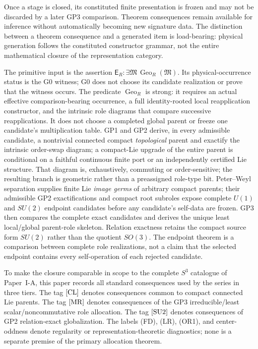 \documentclass[12pt,a4paper]{article}
\begin{document}
Once a stage is closed, its constituted finite presentation is frozen and may
not be discarded by a later GP3 comparison.  Theorem consequences remain
available for inference without automatically becoming new signature data.
The distinction between a theorem consequence and a generated item is
load-bearing: physical generation follows the constituted constructor grammar,
not the entire mathematical closure of the representation category.

The primitive input is the assertion
\(\mathsf E_R:\exists\mathfrak M\,\operatorname{Geo}_R(\mathfrak M)\).
Its physical-occurrence status is the G0 witness; G0 does not choose its
candidate realization or prove that the witness occurs.
The predicate \(\operatorname{Geo}_R\) is strong: it requires an actual
effective comparison-bearing occurrence, a full identity-rooted local
reapplication constructor, and the intrinsic role diagrams that compare
successive reapplications.  It does not choose a completed global parent or
freeze one candidate's multiplication table.  GP1 and GP2 derive, in every
admissible candidate, a nontrivial connected compact \emph{topological}
parent and exactify the intrinsic order-swap diagram; a compact-Lie upgrade
of the entire parent is conditional on a faithful continuous finite port or
an independently certified Lie structure.  That diagram is, exhaustively, commuting or
order-sensitive; the resulting branch is geometric rather than a preassigned
role-type bit.  Peter--Weyl separation supplies finite Lie \emph{image germs} of arbitrary
compact parents; their admissible GP2 exactifications and compact root
subroles expose complete \(U(1)\) and \(SU(2)\) endpoint candidates
before any candidate's self-data are frozen.  GP3 then compares the complete exact candidates and
derives the unique least local/global parent-role skeleton.  Relation exactness
retains the compact source form \(SU(2)\) rather than the quotient \(SO(3)\).
The endpoint theorem is a comparison between complete role realizations, not a
claim that the selected endpoint contains every self-operation of each rejected
candidate.

To make the closure comparable in scope to the complete \(S^3\) catalogue of
Paper~I-A, this paper records all standard consequences used by the series in
three tiers.  The tag \([{\rm CL}]\) denotes consequences common to compact
connected Lie parents.  The tag \([{\rm MR}]\) denotes consequences of the
GP3 irreducible/least scalar/noncommutative role allocation.  The tag
\([{\rm SU2}]\) denotes consequences of GP2 relation-exact globalization.
The labels (FD), (LR), (OR1), and center-oddness denote
regularity or representation-theoretic diagnostics; none is a separate
premise of the primary allocation theorem.
\end{document}
